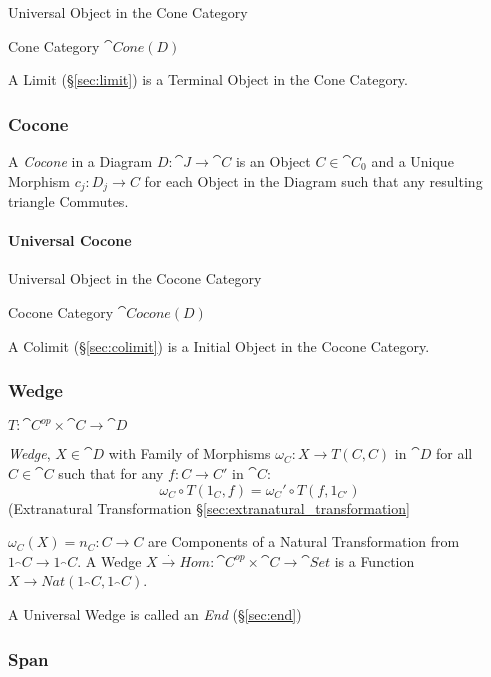 Universal Object in the Cone Category

Cone Category $\cat{Cone}(D)$

A Limit (\S\ref{sec:limit}) is a Terminal Object in the Cone
Category.



\subsubsection{Cocone}\label{sec:cocone}

A \emph{Cocone} in a Diagram $D : \cat{J} \rightarrow \cat{C}$
is an Object $C \in \cat{C}_0$ and a Unique Morphism $c_j : D_j
\rightarrow C$ for each Object in the Diagram such that any resulting
triangle Commutes.




\paragraph{Universal Cocone}\label{sec:universal_cocone}\hfill

Universal Object in the Cocone Category

Cocone Category $\cat{Cocone}(D)$

A Colimit (\S\ref{sec:colimit}) is a Initial Object in the Cocone
Category.



\subsubsection{Wedge}\label{sec:wedge}

$T : \cat{C}^{op} \times \cat{C} \rightarrow \cat{D}$

\emph{Wedge}, $X \in \cat{D}$ with Family of Morphisms $\omega_C :
X \rightarrow T(C,C)$ in $\cat{D}$ for all $C \in \cat{C}$ such
that for any $f : C \rightarrow C'$ in $\cat{C}$:
\[
  \omega_C \circ T(1_C,f) = \omega_C' \circ T(f,1_{C'})
\]
(Extranatural Transformation \S\ref{sec:extranatural_transformation}

$\omega_C(X) = n_C : C \rightarrow C$ are Components of a Natural
Transformation from $1_\cat{C} \rightarrow 1_\cat{C}$. A Wedge
$X \xrightarrow{.} Hom : \cat{C}^{op} \times \cat{C} \rightarrow
\cat{Set}$ is a Function $X \rightarrow Nat
(1_\cat{C},1_\cat{C})$.

A Universal Wedge is called an \emph{End} (\S\ref{sec:end})



\subsubsection{Span}\label{sec:span}

